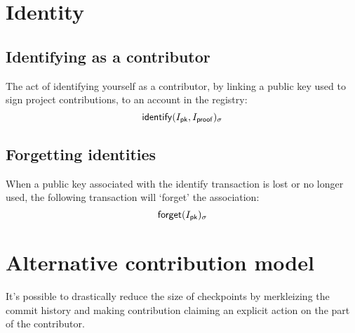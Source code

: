 \section{Identity}

\subsection{Identifying as a contributor}
The act of identifying yourself as a contributor, by linking a public key used
to sign project contributions, to an account in the registry:
\[
    \operatorname{\mathsf{identify}}\lparen I_{\mathsf{pk}}, I_{\mathsf{proof}}\rparen_\sigma
\]


\subsection{Forgetting identities}
When a public key associated with the \textsf{identify} transaction is lost or no
longer used, the following transaction will `forget' the association:
\[
    \operatorname{\mathsf{forget}}\lparen I_{\mathsf{pk}}\rparen_\sigma
\]

\newpage
\appendix


\section{Alternative contribution model}
It's possible to drastically reduce the size of checkpoints by merkleizing the commit
history and making contribution claiming an explicit action on the part of
the contributor.

